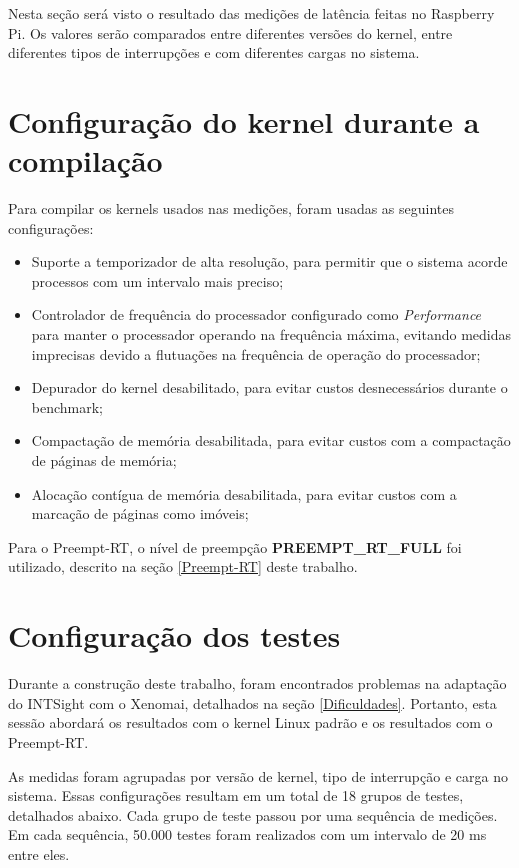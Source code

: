 \label{cap4}

Nesta seção será visto o resultado das medições de latência feitas no Raspberry Pi. Os valores serão comparados entre diferentes versões do kernel, entre diferentes tipos de interrupções e com diferentes cargas no sistema.

\section{Configuração do kernel durante a compilação}

Para compilar os kernels usados nas medições, foram usadas as seguintes configurações:

\begin{itemize}
    \item Suporte a temporizador de alta resolução, para permitir que o sistema acorde processos com um intervalo mais preciso;
    \item Controlador de frequência do processador configurado como \textit{Performance} para manter o processador operando na frequência máxima, evitando medidas imprecisas devido a flutuações na frequência de operação do processador;
    \item Depurador do kernel desabilitado, para evitar custos desnecessários durante o benchmark;
    \item Compactação de memória desabilitada, para evitar custos com a compactação de páginas de memória;
    \item Alocação contígua de memória desabilitada, para evitar custos com a marcação de páginas como imóveis;
\end{itemize}

Para o Preempt-RT, o nível de preempção \textbf{PREEMPT\_RT\_FULL} foi utilizado, descrito na seção \ref{Preempt-RT} deste trabalho.

\section{Configuração dos testes}

Durante a construção deste trabalho, foram encontrados problemas na adaptação do INTSight com o Xenomai, detalhados na seção \ref{Dificuldades}. Portanto, esta sessão abordará os resultados com o kernel Linux padrão e os resultados com o Preempt-RT. 

As medidas foram agrupadas por versão de kernel, tipo de interrupção e carga no sistema. Essas configurações resultam em um total de 18 grupos de testes, detalhados abaixo. Cada grupo de teste passou por uma sequência de medições. Em cada sequência, 50.000 testes foram realizados com um intervalo de 20 ms entre eles.


